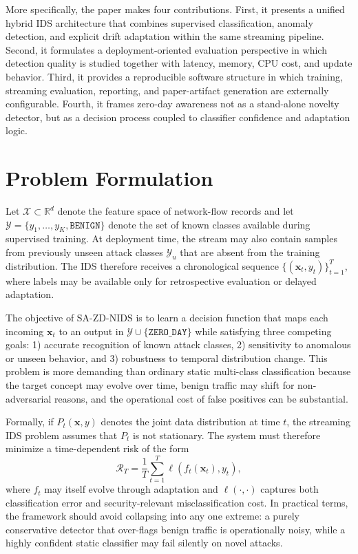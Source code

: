 \documentclass[conference]{IEEEtran}
\begin{document}
More specifically, the paper makes four contributions. First, it presents a unified hybrid IDS architecture that combines supervised classification, anomaly detection, and explicit drift adaptation within the same streaming pipeline. Second, it formulates a deployment-oriented evaluation perspective in which detection quality is studied together with latency, memory, CPU cost, and update behavior. Third, it provides a reproducible software structure in which training, streaming evaluation, reporting, and paper-artifact generation are externally configurable. Fourth, it frames zero-day awareness not as a stand-alone novelty detector, but as a decision process coupled to classifier confidence and adaptation logic.

\section{Problem Formulation}
Let $\mathcal{X} \subset \mathbb{R}^{d}$ denote the feature space of network-flow records and let $\mathcal{Y} = \{y_1,\dots,y_K,\texttt{BENIGN}\}$ denote the set of known classes available during supervised training. At deployment time, the stream may also contain samples from previously unseen attack classes $\mathcal{Y}_{u}$ that are absent from the training distribution. The IDS therefore receives a chronological sequence $\{(\mathbf{x}_t, y_t)\}_{t=1}^{T}$, where labels may be available only for retrospective evaluation or delayed adaptation.

The objective of SA-ZD-NIDS is to learn a decision function that maps each incoming $\mathbf{x}_t$ to an output in $\mathcal{Y} \cup \{\texttt{ZERO\_DAY}\}$ while satisfying three competing goals: 1) accurate recognition of known attack classes, 2) sensitivity to anomalous or unseen behavior, and 3) robustness to temporal distribution change. This problem is more demanding than ordinary static multi-class classification because the target concept may evolve over time, benign traffic may shift for non-adversarial reasons, and the operational cost of false positives can be substantial.

Formally, if $P_t(\mathbf{x}, y)$ denotes the joint data distribution at time $t$, the streaming IDS problem assumes that $P_t$ is not stationary. The system must therefore minimize a time-dependent risk of the form
\begin{equation}
\mathcal{R}_T = \frac{1}{T}\sum_{t=1}^{T}\ell(f_t(\mathbf{x}_t), y_t),
\end{equation}
where $f_t$ may itself evolve through adaptation and $\ell(\cdot,\cdot)$ captures both classification error and security-relevant misclassification cost. In practical terms, the framework should avoid collapsing into any one extreme: a purely conservative detector that over-flags benign traffic is operationally noisy, while a highly confident static classifier may fail silently on novel attacks.
\end{document}
